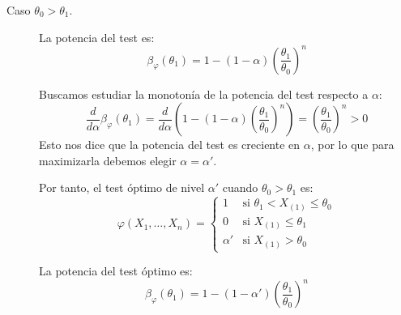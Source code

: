 \begin{ejercicio}
\begin{description}
        \item[Caso $\theta_0 > \theta_1$.] La potencia del test es:
        \begin{equation*}
            \beta_\varphi(\theta_1) = 1 - (1-\alpha)\left(\frac{\theta_1}{\theta_0}\right)^n
        \end{equation*}

        Buscamos estudiar la monotonía de la potencia del test respecto a $\alpha$:
        \begin{equation*}
            \frac{d}{d\alpha}\beta_\varphi(\theta_1) = \frac{d}{d\alpha}\left(1 - (1-\alpha)\left(\frac{\theta_1}{\theta_0}\right)^n\right) = \left(\frac{\theta_1}{\theta_0}\right)^n > 0
        \end{equation*}
        Esto nos dice que la potencia del test es creciente en $\alpha$, por lo que para maximizarla debemos elegir $\alpha = \alpha'$.

        Por tanto, el test óptimo de nivel $\alpha'$ cuando $\theta_0 > \theta_1$ es:
        \begin{equation*}
            \varphi(X_1, \ldots, X_n) = \left\{\begin{array}{ll}
                1 & \text{si\ } \theta_1 < X_{(1)} \leq \theta_0 \\
                0 & \text{si\ } X_{(1)} \leq \theta_1 \\
                \alpha' & \text{si\ } X_{(1)} > \theta_0
            \end{array}\right.
        \end{equation*}

        La potencia del test óptimo es:
        \begin{equation*}
            \beta_\varphi(\theta_1) = 1 - (1-\alpha')\left(\frac{\theta_1}{\theta_0}\right)^n
        \end{equation*}
    \end{description}
\end{ejercicio}

